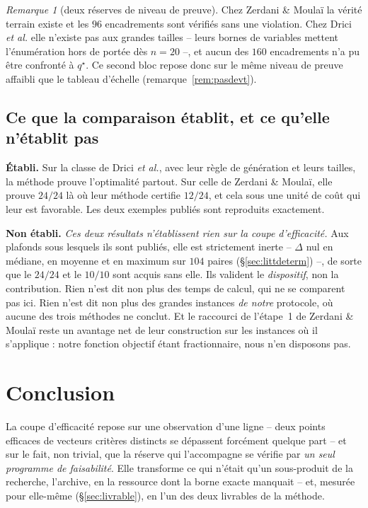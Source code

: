 \documentclass[11pt,a4paper]{article}
\theoremstyle{plain}
\theoremstyle{remark}
\newtheorem{remark}{Remarque}
\newcommand{\qs}{q^{\star}}
\begin{document}
\begin{remark}[deux réserves de niveau de preuve]
\label{rem:littvt}
Chez Zerdani \& Moulaï la vérité terrain existe et les $96$ encadrements
sont vérifiés sans une violation. Chez Drici \emph{et al.} elle n'existe
pas aux grandes tailles -- leurs bornes de variables mettent l'énumération
hors de portée dès $n=20$ --, et aucun des $160$ encadrements n'a pu être
confronté à $\qs$. Ce second bloc repose donc sur le même niveau de preuve
affaibli que le tableau d'échelle (remarque~\ref{rem:pasdevt}).
\end{remark}

\subsection{Ce que la comparaison établit, et ce qu'elle n'établit pas}

\textbf{Établi.} Sur la classe de Drici \emph{et al.}, avec leur règle de
génération et leurs tailles, la méthode prouve l'optimalité partout. Sur
celle de Zerdani \& Moulaï, elle prouve $24/24$ là où leur méthode certifie
$12/24$, et cela sous une unité de coût qui leur est favorable. Les deux
exemples publiés sont reproduits exactement.

\textbf{Non établi.} \emph{Ces deux résultats n'établissent rien sur la
coupe d'efficacité.} Aux plafonds sous lesquels ils sont publiés, elle est
strictement inerte -- $\Delta$ nul en médiane, en moyenne et en maximum sur
$104$ paires (§\ref{sec:littdeterm}) --, de sorte que le $24/24$ et le
$10/10$ sont acquis sans elle. Ils valident le \emph{dispositif}, non la
contribution. Rien n'est dit non plus des temps de calcul, qui ne se
comparent pas ici. Rien n'est dit non plus des grandes instances \emph{de notre}
protocole, où aucune des trois méthodes ne conclut. Et le raccourci de
l'étape~1 de Zerdani \& Moulaï reste un avantage net de leur construction
sur les instances où il s'applique : notre fonction objectif étant
fractionnaire, nous n'en disposons pas.

\section{Conclusion}

La coupe d'efficacité repose sur une observation d'une ligne -- deux points
efficaces de vecteurs critères distincts se dépassent forcément quelque part
-- et sur le fait, non trivial, que la réserve qui l'accompagne se vérifie
par \emph{un seul programme de faisabilité}. Elle transforme ce qui n'était
qu'un sous-produit de la recherche, l'archive, en la ressource dont la borne
exacte manquait -- et, mesurée pour elle-même (\S\ref{sec:livrable}), en
l'un des deux livrables de la méthode.
\end{document}
